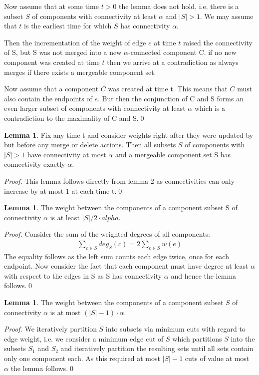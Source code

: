 \documentclass[a4paper,xcolor=dvipsnames, tikz, 12pt]{article}
\newcommand{\crep}{\text{C{\scriptsize REP}}}
\theoremstyle{definition}
\newtheorem{lemma}[defi]{Lemma}
\begin{document}
Now assume that at some time $t>0$ the lemma does not hold, i.e. there is a subset $S$ of components with connectivity at least $\alpha$ and $|S|>1$. We may assume that $t$ is the earliest time for which $S$ has connectivity $\alpha$.

Then the incrementation of the weight of edge $e$ at time $t$ raised the connectivity of S, but S was not merged into a new $\alpha$-connected component C. if no new component was created at time $t$ then we arrive at a contradiction as \crep{} always merges if there exists a mergeable component set.

Now assume that a component $C$ was created at time t. This means that $C$ must also contain the endpoints of $e$. But then the conjunction of C and S forms an even larger subset of components with connectivity at least $\alpha$ which is a contradiction to the maximality of C and S.\qed

\begin{lemma}
	\label{mergeable_lemma}
	Fix any time t and consider weights right after they were updated by \crep{} but before any merge or delete actions. Then all subsets $S$ of components with $|S|>1$ have connectivity at most $\alpha$ and a mergeable component set S has connectivity exactly $\alpha$.
\end{lemma}

\textit{Proof.} This lemma follows directly from lemma 2 as connectivities can only increase by at most 1 at each time t.\qed

\begin{lemma}
	\label{cut_lemma}
	The weight between the components of a component subset S of connectivity $\alpha$ is at least $|S|/2 \cdot alpha$.
\end{lemma}
\textit{Proof.} Consider the sum of the weighted degrees of all components:
\begin{align*}
\sum_{c\in S}deg_S(c)=2\sum_{e\in S}w(e)
\end{align*}
The equality follows as the left sum counts each edge twice, once for each endpoint.
Now consider the fact that each component must have degree at least $\alpha$ with respect to the edges in S as S has connectivity $\alpha$ and hence the lemma follows.\qed

\begin{lemma}
	\label{cut_lemma_upper}
	The weight between the components of a component subset $S$ of connectivity $\alpha$ is at most $(|S|-1)\cdot\alpha$.
\end{lemma}
\textit{Proof.} We iteratively partition $S$ into subsets via minimum cuts with regard to edge weight, i.e. we consider a minimum edge cut of $S$ which partitions $S$ into the subsets $S_1$ and $S_2$ and iteratively partition the resulting sets until all sets contain only one component each. As this required at most $|S|-1$ cuts of value at most $\alpha$ the lemma follows.\qed
\end{document}
